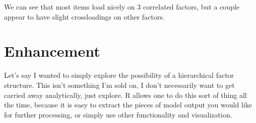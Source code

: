 \documentclass[english,nohyper,titlepage]{tufte-handout}\usepackage[]{graphicx}\usepackage[]{color}
\begin{document}
We can see that most items load nicely on 3 correlated factors, but a couple appear to have slight crossloadings on other factors.  

\section{Enhancement}
Let's say I wanted to simply explore the possibility of a hierarchical factor structure. This isn't something I'm sold on, I don't necessarily want to get carried away analytically, just explore.  R allows one to do this sort of thing all the time, because it is easy to extract the pieces of model output you would like for further processing, or simply use other functionality and visualization.  
\end{document}
